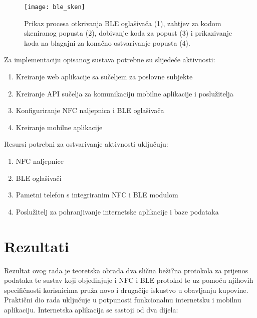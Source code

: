 \begin{figure}[!htbp]
	\begin{center}
 \texttt{[image: ble\_sken]}
 \caption{Prikaz procesa otkrivanja BLE ogla\v{s}iva\v{c}a (1), zahtjev za kodom skeniranog popusta (2), dobivanje koda za popust (3) i prikazivanje koda na blagajni za kona\v{c}no ostvarivanje popusta (4).}
 \label{fig:otkrivanjeBLEa}
	\end{center}
\end{figure}

Za implementaciju opisanog sustava potrebne su slijede\'{c}e aktivnosti:
\begin{enumerate}
	\item Kreiranje web aplikacije sa su\v{c}eljem za poslovne subjekte
	\item Kreiranje API su\v{c}elja za komunikaciju mobilne aplikacije i poslu\v{z}itelja
	\item Konfiguriranje NFC naljepnica i BLE ogla\v{s}iva\v{c}a
	\item Kreiranje mobilne aplikacije
	
\end{enumerate}

Resursi potrebni za ostvarivanje aktivnosti uklju\v{c}uju:
\begin{enumerate}
	\item NFC naljepnice
	\item BLE ogla\v{s}iva\v{c}i
	\item Pametni telefon s integriranim NFC i BLE modulom
	\item Poslu\v{z}itelj za pohranjivanje internetske aplikacije i baze podataka
\end{enumerate}


\section{Rezultati}

Rezultat ovog rada je teoretska obrada dva sli\v{c}na be\v{z}i?na protokola za prijenos podataka te sustav koji objedinjuje i NFC i BLE protokol te uz pomo\'{c}u njihovih specifi\v{c}nosti korisnicima pru\v{z}a novo i druga\v{c}ije iskustvo u obavljanju kupovine. Prakti\v{c}ni dio rada uklju\v{c}uje u potpunosti funkcionalnu internetsku i mobilnu aplikaciju. Internetska aplikacija se sastoji od dva dijela:

